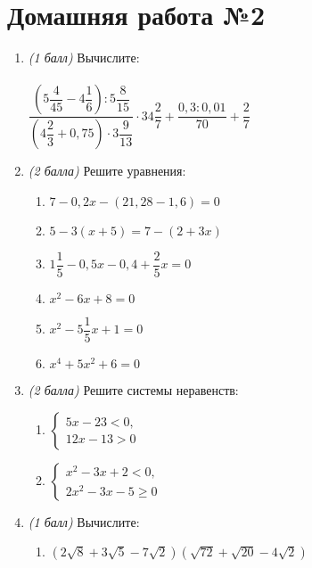 \documentclass[12pt, a4paper]{article}
\begin{document}
	
	\section*{Домашняя работа №2}
	\begin{enumerate}
		\item \textit{(1 балл)} Вычислите:\\\\
		$\dfrac{\left( 5\dfrac{4}{45}-4\dfrac{1}{6}\right) :5\dfrac{8}{15}}{\left( 4\dfrac{2}{3}+0,75\right)\cdot3\dfrac{9}{13} }\cdot34\dfrac{2}{7}+\dfrac{0,3:0,01}{70}+\dfrac{2}{7}$
		\item \textit{(2 балла)} Решите уравнения:
		\begin{multicols}{2}
			\begin{enumerate}[label=\asbuk*)]
				\item $7-0,2x-(21,28-1,6)=0$
				\item $5-3(x+5)=7-(2+3x)$
				\item $1\dfrac{1}{5}-0,5x-0,4+\dfrac{2}{5}x=0$
				\item $x^2-6x+8=0$
				\item $x^2-5\dfrac{1}{5}x+1=0$
				\item $x^4+5x^2+6=0$
			\end{enumerate}
		\end{multicols}
		\item \textit{(2 балла)} Решите системы неравенств:
		\begin{multicols}{2}
			\begin{enumerate}[label=\asbuk*)]
				\item $
				\left\{
				\begin{aligned}
					5x-23<0,\\
					12x-13>0
				\end{aligned}
				\right.
				$
				\item $
				\left\{
				\begin{aligned}
					x^2-3x+2<0,\\
					2x^2-3x-5 \geqslant 0
				\end{aligned}
				\right.
				$
			\end{enumerate}
		\end{multicols}
		\item \textit{(1 балл)} Вычислите:
			\begin{multicols}{2}
			\begin{enumerate}[label=\asbuk*)]
				\item $(2\sqrt{8}+3\sqrt{5}-7\sqrt{2})(\sqrt{72}+\sqrt{20}-4\sqrt{2})$

\end{enumerate}
\end{multicols}
\end{enumerate}
\end{document}
